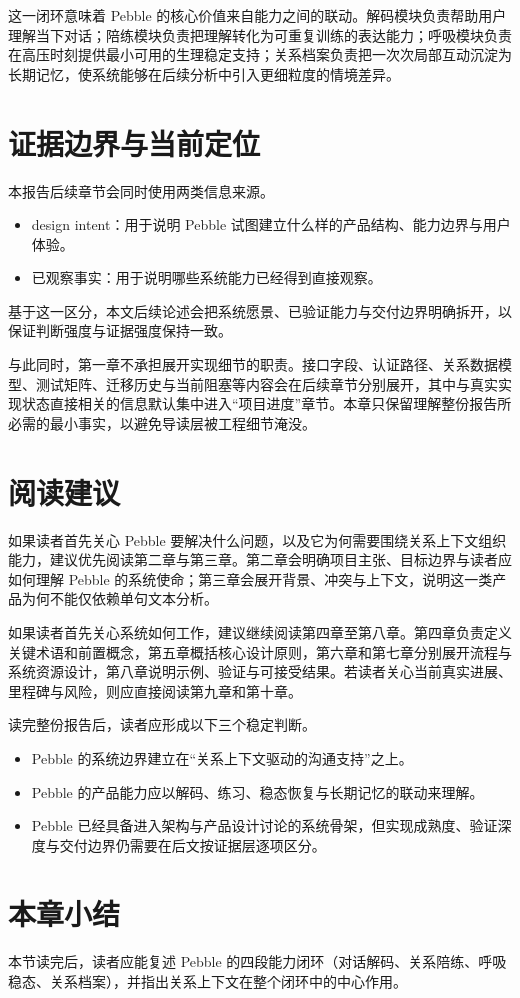 这一闭环意味着 Pebble 的核心价值来自能力之间的联动。解码模块负责帮助用户理解当下对话；陪练模块负责把理解转化为可重复训练的表达能力；呼吸模块负责在高压时刻提供最小可用的生理稳定支持；关系档案负责把一次次局部互动沉淀为长期记忆，使系统能够在后续分析中引入更细粒度的情境差异。

\section{证据边界与当前定位}

本报告后续章节会同时使用两类信息来源。

\begin{itemize}
  \item design intent：用于说明 Pebble 试图建立什么样的产品结构、能力边界与用户体验。
  \item 已观察事实：用于说明哪些系统能力已经得到直接观察。
\end{itemize}

基于这一区分，本文后续论述会把系统愿景、已验证能力与交付边界明确拆开，以保证判断强度与证据强度保持一致。

与此同时，第一章不承担展开实现细节的职责。接口字段、认证路径、关系数据模型、测试矩阵、迁移历史与当前阻塞等内容会在后续章节分别展开，其中与真实实现状态直接相关的信息默认集中进入“项目进度”章节。本章只保留理解整份报告所必需的最小事实，以避免导读层被工程细节淹没。

\section{阅读建议}

如果读者首先关心 Pebble 要解决什么问题，以及它为何需要围绕关系上下文组织能力，建议优先阅读第二章与第三章。第二章会明确项目主张、目标边界与读者应如何理解 Pebble 的系统使命；第三章会展开背景、冲突与上下文，说明这一类产品为何不能仅依赖单句文本分析。

如果读者首先关心系统如何工作，建议继续阅读第四章至第八章。第四章负责定义关键术语和前置概念，第五章概括核心设计原则，第六章和第七章分别展开流程与系统资源设计，第八章说明示例、验证与可接受结果。若读者关心当前真实进展、里程碑与风险，则应直接阅读第九章和第十章。

读完整份报告后，读者应形成以下三个稳定判断。

\begin{itemize}
  \item Pebble 的系统边界建立在“关系上下文驱动的沟通支持”之上。
  \item Pebble 的产品能力应以解码、练习、稳态恢复与长期记忆的联动来理解。
  \item Pebble 已经具备进入架构与产品设计讨论的系统骨架，但实现成熟度、验证深度与交付边界仍需要在后文按证据层逐项区分。
\end{itemize}

\section{本章小结}

本节读完后，读者应能复述 Pebble 的四段能力闭环（对话解码、关系陪练、呼吸稳态、关系档案），并指出关系上下文在整个闭环中的中心作用。
